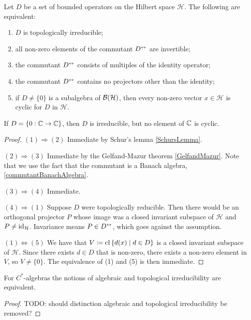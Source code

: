 \begin{proposition} \label{equivalentsIrreducibleSetsOperatorsHilbertSpace}
Let $D$ be a set of bounded operators on the Hilbert space $\mathcal{H}$. The following are equivalent:
\begin{enumerate}
\item $D$ is topologically irreducible;
\item all non-zero elements of the commutant $D^\leftrightarrow$ are invertible; 
\item the commutant $D^\leftrightarrow$ consists of multiples of the identity operator;
\item the commutant $D^\leftrightarrow$ contains no projectors other than the identity;
\item if $D \neq \{0\}$ is a subalgebra of $\operatorname{\mathcal{B}}(\mathcal{H})$, then every non-zero vector $x\in\mathcal{H}$ is cyclic for $D$ in $\mathcal{H}$.
\end{enumerate}
\end{proposition}
If $D = \{0: \mathbb{C}\to \mathbb{C}\}$, then $D$ is irreducible, but no element of $\mathbb{C}$ is cyclic.
\begin{proof}
$(1) \Rightarrow (2)$ Immediate by Schur's lemma \ref{SchursLemma}.

$(2) \Rightarrow (3)$ Immediate by the Gelfand-Mazur theorem \ref{GelfandMazur}. Note that we use the fact that the commutant is a Banach algebra, \ref{commutantBanachAlgebra}.

$(3) \Rightarrow (4)$ Immediate.

$(4) \Rightarrow (1)$ Suppose $D$ were topologically reducible. Then there would be an orthogonal projector $P$ whose image was a closed invariant subspace of $\mathcal{H}$ and $P\neq \operatorname{id}_\mathcal{H}$. Invariance means $P\in D^\leftrightarrow$, which goes against the assumption.

$(1) \Leftrightarrow (5)$ We have that $V \defeq \closure\setbuilder{d(x)}{d\in D}$ is a closed invariant subspace of $\mathcal{H}$. Since there exists $d\in D$ that is non-zero, there exists a non-zero element in $V$, so $V\neq \{0\}$. The equivalence of (1) and (5) is then immediate.
\end{proof}
\begin{corollary}
For $C^*$-algebras the notions of algebraic and topological irreducibility are equivalent.
\end{corollary}
\begin{proof}
TODO: should distinction algebraic and topological irreducibility be removed?
\end{proof}

